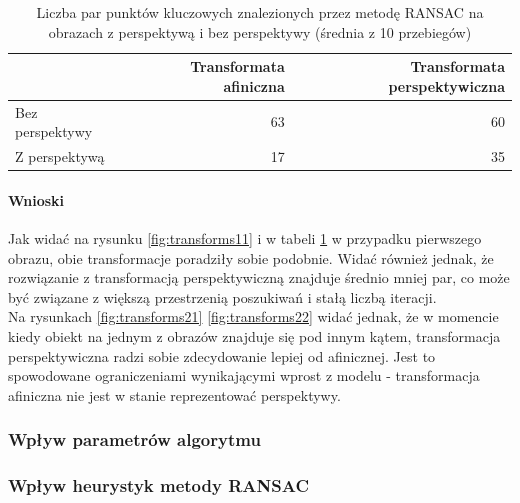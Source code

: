\documentclass{article}
\begin{document}
	\begin{table}[H]
		\caption{Liczba par punktów kluczowych znalezionych przez metodę RANSAC na obrazach z perspektywą i bez perspektywy (średnia z 10 przebiegów)}
		\label{tab:transforms}
		\begin{tabular}{|l|r|r|}
			\hline
			& \textbf{Transformata afiniczna} & \textbf{Transformata perspektywiczna} \\ \hline
			Bez perspektywy & 63                     & 60                           \\ \hline
			Z perspektywą   & 17                     & 35                           \\ \hline
		\end{tabular}
	\end{table}

	\paragraph{Wnioski}
	Jak widać na rysunku \ref{fig:transforms11} i w tabeli \ref{tab:transforms} w przypadku pierwszego obrazu, obie transformacje poradziły sobie podobnie. Widać również jednak, że rozwiązanie z transformacją perspektywiczną znajduje średnio mniej par, co może być związane z większą przestrzenią poszukiwań i stałą liczbą iteracji.\\
	Na rysunkach \ref{fig:transforms21} \ref{fig:transforms22} widać jednak, że w momencie kiedy obiekt na jednym z obrazów znajduje się pod innym kątem, transformacja perspektywiczna radzi sobie zdecydowanie lepiej od afinicznej. Jest to spowodowane ograniczeniami wynikającymi wprost z modelu - transformacja afiniczna nie jest w stanie reprezentować perspektywy.
	
	\subsubsection{Wpływ parametrów algorytmu}
	\subsubsection{Wpływ heurystyk metody RANSAC}
	
	
\end{document}
